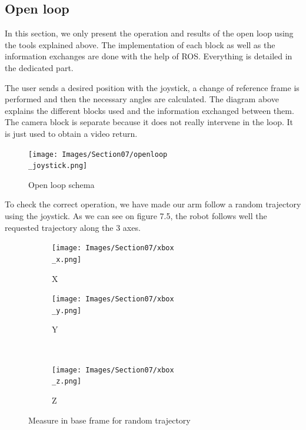 \subsection{Open loop}

In this section, we only present the operation and results of the open loop using the tools explained above. The implementation of each block as well as the information exchanges are done with the help of ROS. Everything is detailed in the dedicated part.

\bigbreak
The user sends a desired position with the joystick, a change of reference frame is performed and then the necessary angles are calculated. The diagram above explains the different blocks used and the information exchanged between them. The camera block is separate because it does not really intervene in the loop. It is just used to obtain a video return.
\begin{figure}[H]
    \centering
    \texttt{[image: Images/Section07/openloop\\\_joystick.png]}
    \caption{Open loop schema}
    \label{fig:OpenLoopSchema}
\end{figure}

To check the correct operation, we have made our arm follow a random trajectory using the joystick. As we can see on figure 7.5, the robot follows well the requested trajectory along the 3 axes.
\begin{figure}[H]
    \begin{subfigure}{.5\linewidth}
        \centering
        \texttt{[image: Images/Section07/xbox\\\_x.png]}
        \caption{X}
        \label{fig:XboxtrajX}
    \end{subfigure}%
    \begin{subfigure}{.5\linewidth}
        \centering
        \texttt{[image: Images/Section07/xbox\\\_y.png]}
        \caption{Y}
        \label{fig:XboxtrajY}
    \end{subfigure}\\[1ex]
    \begin{subfigure}{\linewidth}
        \centering
        \texttt{[image: Images/Section07/xbox\\\_z.png]}
        \caption{Z}
        \label{fig:XboxtrajZ}
        \end{subfigure}
        \caption{Measure in base frame for random trajectory}
        \label{fig:Xboxtraj}
\end{figure}
\FloatBarrier

